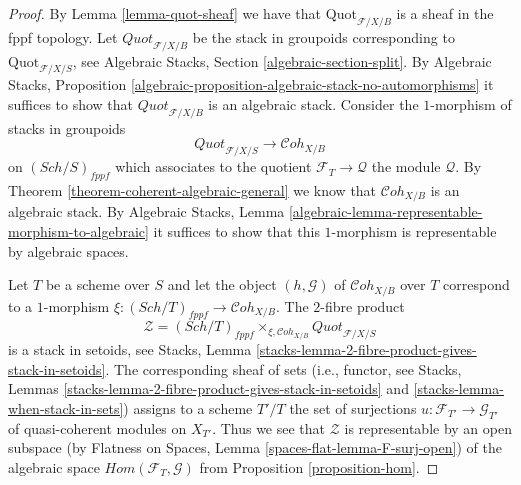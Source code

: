 \documentclass{stacks-project}
\theoremstyle{plain}
\theoremstyle{definition}
\theoremstyle{remark}
\numberwithin{equation}{subsection}
\def\Sch{\mathit{Sch}}
\def\Cohstack{\mathcal{C}\!\mathit{oh}}
\def\Quotfunctor{\mathrm{Quot}}
\begin{document}
\begin{proof}
By Lemma \ref{lemma-quot-sheaf}
we have that $\Quotfunctor_{\mathcal{F}/X/B}$ is a sheaf in the
fppf topology. Let $\textit{Quot}_{\mathcal{F}/X/B}$ be the stack in
groupoids corresponding to $\Quotfunctor_{\mathcal{F}/X/S}$, see
Algebraic Stacks, Section \ref{algebraic-section-split}.
By Algebraic Stacks, Proposition
\ref{algebraic-proposition-algebraic-stack-no-automorphisms}
it suffices to show that $\textit{Quot}_{\mathcal{F}/X/B}$
is an algebraic stack.
Consider the $1$-morphism of stacks in groupoids
$$
\textit{Quot}_{\mathcal{F}/X/S}
\longrightarrow
\Cohstack_{X/B}
$$
on $(\Sch/S)_{fppf}$ which associates to the quotient
$\mathcal{F}_T \to \mathcal{Q}$ the module $\mathcal{Q}$.
By Theorem \ref{theorem-coherent-algebraic-general} we know that
$\Cohstack_{X/B}$ is an algebraic stack.
By Algebraic Stacks, Lemma
\ref{algebraic-lemma-representable-morphism-to-algebraic}
it suffices to show that this $1$-morphism is representable
by algebraic spaces.

\medskip\noindent
Let $T$ be a scheme over $S$ and let the object $(h, \mathcal{G})$ of
$\Cohstack_{X/B}$ over $T$ correspond
to a $1$-morphism $\xi : (\Sch/T)_{fppf} \to \Cohstack_{X/B}$.
The $2$-fibre product
$$
\mathcal{Z} =
(\Sch/T)_{fppf}
\times_{\xi, \Cohstack_{X/B}}
\textit{Quot}_{\mathcal{F}/X/S}
$$
is a stack in setoids, see
Stacks, Lemma \ref{stacks-lemma-2-fibre-product-gives-stack-in-setoids}.
The corresponding sheaf of sets (i.e., functor, see
Stacks, Lemmas
\ref{stacks-lemma-2-fibre-product-gives-stack-in-setoids} and
\ref{stacks-lemma-when-stack-in-sets}) assigns to a scheme
$T'/T$ the set of surjections $u : \mathcal{F}_{T'} \to \mathcal{G}_{T'}$
of quasi-coherent modules on $X_{T'}$. Thus we see that
$\mathcal{Z}$ is representable by an open subspace
(by Flatness on Spaces, Lemma \ref{spaces-flat-lemma-F-surj-open})
of the algebraic space
$\mathit{Hom}(\mathcal{F}_T, \mathcal{G})$ from
Proposition \ref{proposition-hom}.
\end{proof}
\end{document}
